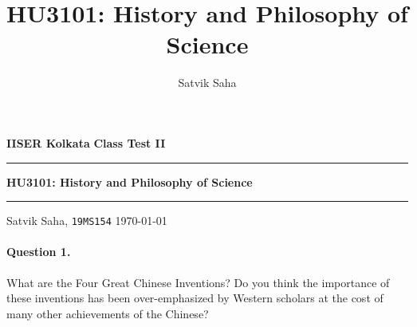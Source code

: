 \documentclass[11pt]{article}
\title{HU3101: History and Philosophy of Science}
\author{Satvik Saha}
\date{}
\theoremstyle{remark}
\begin{document}
    \noindent\textbf{IISER Kolkata} \hfill \textbf{Class Test II}
    \vspace{3pt}
    \hrule
    \vspace{3pt}
    \begin{center}
    \LARGE{\textbf{HU3101: History and Philosophy of Science}}
    \end{center}
    \vspace{3pt}
    \hrule
    \vspace{3pt}
    Satvik Saha, \texttt{19MS154} \hfill \today
    \vspace{20pt}

    \paragraph{Question 1.} What are the Four Great Chinese Inventions? Do you think
    the importance of these inventions has been over-emphasized by Western scholars
    at the cost of many other achievements of the Chinese?
\end{document}
